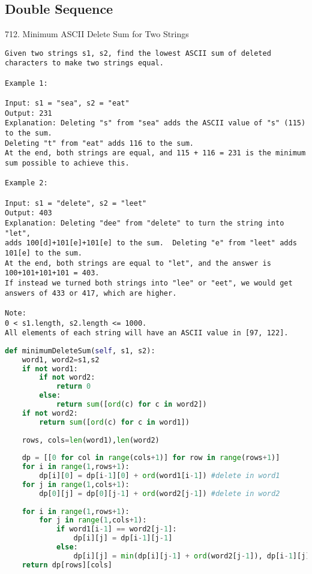 \documentclass[../main.tex]{subfiles}
\begin{document}
\subsection{Double Sequence}
712. Minimum ASCII Delete Sum for Two Strings
\begin{lstlisting}
Given two strings s1, s2, find the lowest ASCII sum of deleted characters to make two strings equal.

Example 1:

Input: s1 = "sea", s2 = "eat"
Output: 231
Explanation: Deleting "s" from "sea" adds the ASCII value of "s" (115) to the sum.
Deleting "t" from "eat" adds 116 to the sum.
At the end, both strings are equal, and 115 + 116 = 231 is the minimum sum possible to achieve this.

Example 2:

Input: s1 = "delete", s2 = "leet"
Output: 403
Explanation: Deleting "dee" from "delete" to turn the string into "let",
adds 100[d]+101[e]+101[e] to the sum.  Deleting "e" from "leet" adds 101[e] to the sum.
At the end, both strings are equal to "let", and the answer is 100+101+101+101 = 403.
If instead we turned both strings into "lee" or "eet", we would get answers of 433 or 417, which are higher.

Note:
0 < s1.length, s2.length <= 1000.
All elements of each string will have an ASCII value in [97, 122].
\end{lstlisting}

\begin{lstlisting}[language=Python]
def minimumDeleteSum(self, s1, s2):
    word1, word2=s1,s2
    if not word1:
        if not word2:
            return 0
        else:
            return sum([ord(c) for c in word2])
    if not word2:
        return sum([ord(c) for c in word1])
    
    rows, cols=len(word1),len(word2)
    
    dp = [[0 for col in range(cols+1)] for row in range(rows+1)]
    for i in range(1,rows+1):
        dp[i][0] = dp[i-1][0] + ord(word1[i-1]) #delete in word1
    for j in range(1,cols+1):
        dp[0][j] = dp[0][j-1] + ord(word2[j-1]) #delete in word2
        
    for i in range(1,rows+1):
        for j in range(1,cols+1):
            if word1[i-1] == word2[j-1]:
                dp[i][j] = dp[i-1][j-1]
            else:
                dp[i][j] = min(dp[i][j-1] + ord(word2[j-1]), dp[i-1][j] + ord(word1[i-1])) #delete in word2, delete in word1
    return dp[rows][cols]
\end{lstlisting}
\end{document}
